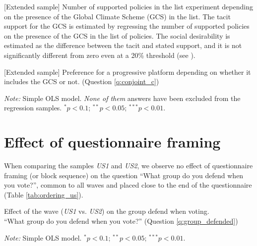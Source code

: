   
\begin{table}[h]
  \caption[(Extended sample) List experiment: tacit support for the GCS]{[Extended sample] Number of supported policies in the list experiment depending on the presence of the Global Climate Scheme (GCS) in the list. 
   The tacit support for the GCS is estimated by regressing the number of supported policies on the presence of the GCS in the list of policies. The social desirability is estimated as the difference between the tacit and stated support, and it is not significantly different from zero even at a 20\% threshold (see ).
  }\label{tab:list_exp_alla}
  \makebox[\textwidth][c]{
  }  
\end{table}


\begin{table}[h]
    \caption[(Extended sample) Influence of the GCS on electoral prospects]{[Extended sample] Preference for a progressive platform depending on whether it includes the GCS or not. (Question \ref{q:conjoint_c}) 
  } 
    \makebox[\textwidth][c]{}\label{tab:_alla}
    {\footnotesize \textit{Note:} Simple OLS model. \textit{None of them} answers have been excluded from the regression samples. $^{*}p<0.1$; $^{**} p<0.05$; $^{***} p<0.01$. 
    }
\end{table}

\clearpage
\section{Effect of questionnaire framing}\label{app:ordering_us}

When comparing the samples \textit{US1} and \textit{US2}, we observe no effect of questionnaire framing (or block sequence) on the question ``What group do you defend when you vote?'', common to all waves and placed close to the end of the questionnaire (Table \ref{tab:ordering_us}).

\begin{table}[h]
    \caption[Effect of the wave on group defend when voting]{Effect of the wave (\textit{US1} vs. \textit{US2}) on the group defend when voting. \\ ``What group do you defend when you vote?'' (Question \ref{q:group_defended}) 
  } 
    \makebox[\textwidth][c]{}\label{tab:ordering_us}
    {\footnotesize \textit{Note:} Simple OLS model. $^{*}p<0.1$; $^{**} p<0.05$; $^{***} p<0.01$. 
    }
\end{table}